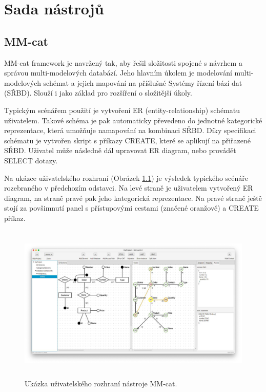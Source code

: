 \pagestyle{plain}  %

\chapter{Sada nástrojů}



\section{MM-cat}

MM-cat framework je navržený tak, aby řešil složitosti spojené s návrhem a správou multi-modelových databází. Jeho hlavním úkolem je modelování multi-modelových schémat a jejich mapování na příšlušné Systémy řízení bází dat (SŘBD). Slouží i jako základ pro rozšíření o složitější úkoly.

Typickým scénářem použití je vytvoření ER (entity-relationship) schématu uživatelem. Takové schéma je pak automaticky převedeno do jednotné kategorické reprezentace, která umožňuje namapování na kombinaci SŘBD. Díky specifikaci schématu je vytvořen skript s příkazy CREATE, které se aplikují na přiřazené SŘBD. Uživatel může následně dál upravovat ER diagram, nebo provádět SELECT dotazy.

Na ukázce uživatelského rozhraní (Obrázek \ref{obr01:mm-cat}) je výsledek typického scénáře rozebraného v předchozím odstavci. Na levé straně je uživatelem vytvořený ER diagram, na straně pravé pak jeho kategorická reprezentace. Na pravé straně ještě stojí za povšimnutí panel s přístupovými cestami (značené oranžově) a CREATE příkaz.

\begin{figure}[htb]
  \centering
  \includegraphics[height=75mm]{../img/mm-cat}
  \caption{Ukázka uživatelského rozhraní nástroje MM-cat.}
  \label{obr01:mm-cat}
\end{figure}

